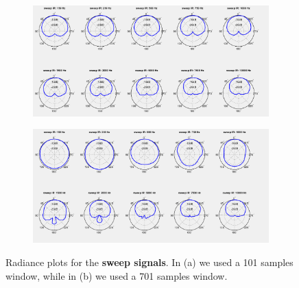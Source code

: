 \documentclass[a4paper]{article}
\begin{document}
\begin{figure}[h]
	\centering
	\begin{subfigure}{0.85\linewidth}
		\centering
		\includegraphics[width=\linewidth]{5b_radiance_50.png}
		\caption{}
	\end{subfigure}
	
	\begin{subfigure}{0.85\linewidth}
		\centering
		\includegraphics[width=\linewidth]{5b_radiance_350.png}
		\caption{}
	\end{subfigure}
	\caption{Radiance plots for the \textbf{sweep signals}. In (a) we used a 101 samples window, while in (b) we used a 701 samples window.}
	\label{fig:sweeprad5}
\end{figure}
\end{document}
